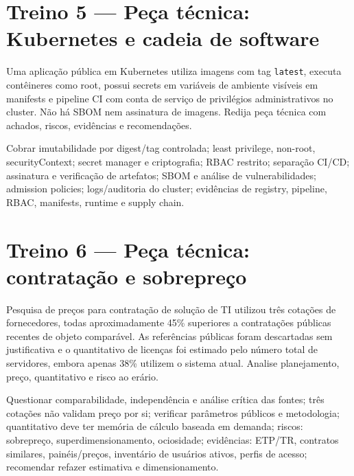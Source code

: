 \section{Treino 5 — Peça técnica: Kubernetes e cadeia de software}

\begin{discursiva}
Uma aplicação pública em Kubernetes utiliza imagens com tag \texttt{latest}, executa contêineres como root, possui secrets em variáveis de ambiente visíveis em manifests e pipeline CI com conta de serviço de privilégios administrativos no cluster. Não há SBOM nem assinatura de imagens. Redija peça técnica com achados, riscos, evidências e recomendações.
\end{discursiva}

\begin{resumo}
Cobrar imutabilidade por digest/tag controlada; least privilege, non-root, securityContext; secret manager e criptografia; RBAC restrito; separação CI/CD; assinatura e verificação de artefatos; SBOM e análise de vulnerabilidades; admission policies; logs/auditoria do cluster; evidências de registry, pipeline, RBAC, manifests, runtime e supply chain.
\end{resumo}

\section{Treino 6 — Peça técnica: contratação e sobrepreço}

\begin{discursiva}
Pesquisa de preços para contratação de solução de TI utilizou três cotações de fornecedores, todas aproximadamente 45\% superiores a contratações públicas recentes de objeto comparável. As referências públicas foram descartadas sem justificativa e o quantitativo de licenças foi estimado pelo número total de servidores, embora apenas 38\% utilizem o sistema atual. Analise planejamento, preço, quantitativo e risco ao erário.
\end{discursiva}

\begin{resumo}
Questionar comparabilidade, independência e análise crítica das fontes; três cotações não validam preço por si; verificar parâmetros públicos e metodologia; quantitativo deve ter memória de cálculo baseada em demanda; riscos: sobrepreço, superdimensionamento, ociosidade; evidências: ETP/TR, contratos similares, painéis/preços, inventário de usuários ativos, perfis de acesso; recomendar refazer estimativa e dimensionamento.
\end{resumo}

